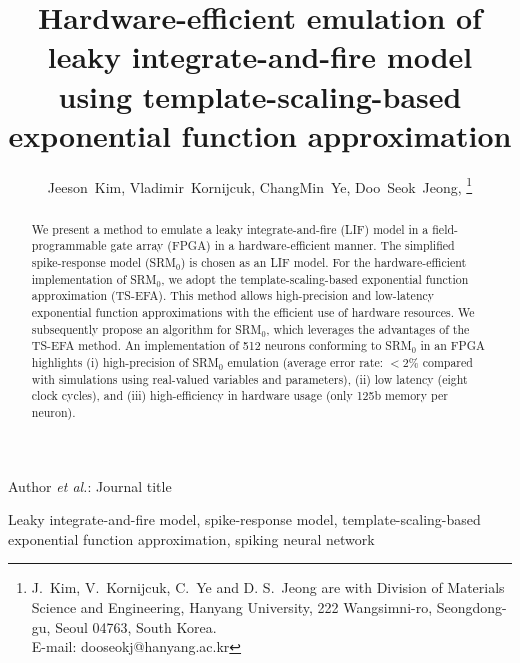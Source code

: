 \documentclass[10pt,journal]{IEEEtran}
\begin{document}

\title{Hardware-efficient emulation of leaky integrate-and-fire model using template-scaling-based exponential function approximation}

\author{Jeeson~Kim, Vladimir~Kornijcuk, ChangMin~Ye, Doo~Seok~Jeong,
\thanks{J.~Kim, V.~Kornijcuk, C.~Ye and D. S.~Jeong are with Division of Materials Science and Engineering, Hanyang University, 222 Wangsimni-ro, Seongdong-gu, Seoul 04763, South Korea.\protect\\ E-mail: dooseokj@hanyang.ac.kr}}

{Author \MakeLowercase{\textit{et al.}}: Journal title}

\maketitle
\begin{abstract}
We present a method to emulate a leaky integrate-and-fire (LIF) model in a field-programmable gate array (FPGA) in a hardware-efficient manner. The simplified spike-response model (SRM$_\textrm{0}$) is chosen as an LIF model. For the hardware-efficient implementation of SRM$_\textrm{0}$, we adopt the template-scaling-based exponential function approximation (TS-EFA). This method allows high-precision and low-latency exponential function approximations with the efficient use of hardware resources. We subsequently propose an algorithm for SRM$_\textrm{0}$, which leverages the advantages of the TS-EFA method. An implementation of 512 neurons conforming to SRM$_\textrm{0}$ in an FPGA highlights (i) high-precision of SRM$_\textrm{0}$ emulation (average error rate: $<2\%$ compared with simulations using real-valued variables and parameters), (ii) low latency (eight clock cycles), and (iii) high-efficiency in hardware usage (only 125b memory per neuron).
\end{abstract}

\begin{IEEEkeywords}
Leaky integrate-and-fire model, spike-response model, template-scaling-based exponential function approximation, spiking neural network
\end{IEEEkeywords}


\IEEEpeerreviewmaketitle
\end{document}
